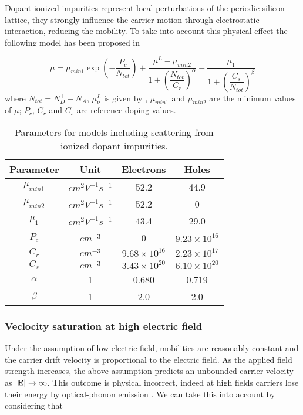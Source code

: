 Dopant ionized impurities represent local perturbations of the periodic silicon lattice, they strongly influence the carrier motion through electrostatic interaction, reducing the mobility. To take into account this physical effect the following model has been proposed in \cite{Masetti:MobDop}


\begin{equation}
\label{eq: mobility impurities}
\mu = \mu_{min1}\exp\left( 	- \dfrac{P_c}{N_{tot}}\right)
 + \dfrac{\mu^L-\mu_{min2}}{1 + \left( \dfrac{N_{tot}}{C_r} \right)^{\alpha} } 
 - \dfrac{\mu_1}{1 + \left( \dfrac{C_s}{N_{tot}} \right)^{\beta} } 
\end{equation}
where $N_{tot} = N_D^+ + N_A^-$, $\mu_\nu^L$ is given by , $\mu_{min1}$ and $\mu_{min2}$  are the minimum values of $\mu$; $P_c$, $C_r$ and $C_s$ are reference doping values.


\begin{table}[!h]
\centering
\begin{tabular}{cccc}
\toprule
Parameter & Unit & Electrons & Holes \\
\midrule
$\mu_{min1}$ & $cm^2V^{-1}s^{-1}$ & 52.2 & 44.9\\
$\mu_{min2}$ & $cm^2V^{-1}s^{-1}$ & 52.2 & 0\\
$\mu_1$ & $cm^2V^{-1}s^{-1}$ & 43.4 & 29.0 \\
$P_c$ & $cm^{-3}$ & 0 & $9.23\times 10^{16}$\\
$C_r$ & $cm^{-3}$ &  $9.68\times 10^{16}$ & $2.23\times 10^{17}$ \\
$C_s$ & $cm^{-3}$ & $3.43\times 10^{20}$ & $6.10\times 10^{20}$\\
$\alpha$& 1 & 0.680 & 0.719  \\
$\beta$& 1 & 2.0 & 2.0 \\
\bottomrule
\end{tabular}
\caption{Parameters for models including scattering from ionized dopant impurities.}
\end{table}


\subsubsection{Veclocity saturation at high electric field}

Under the assumption of low electric field, mobilities are reasonably constant and the carrier drift velocity is proportional to the electric field. As the applied field strength increases, the above assumption predicts an unbounded carrier velocity as $|\mathbf{E}| \rightarrow \infty$. This outcome is physical incorrect, indeed at high fields carriers lose their energy by optical-phonon emission \cite{ModernVLSIdevices}. We can take this into account by considering that


